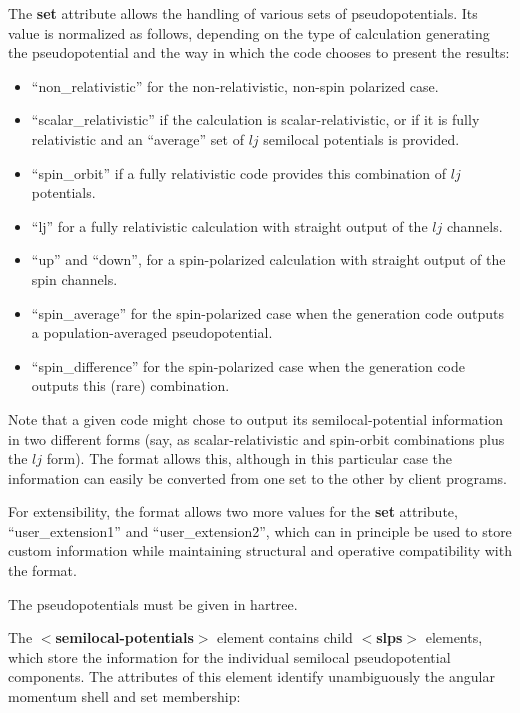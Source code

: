 \documentclass[prb,showpacs,superscriptaddress]{revtex4-1}
\def\tag#1{\textbf{$<$#1$>$}}
\def\att#1{\textbf{#1}}
\begin{document}
The \att{set} attribute allows the handling of various sets of
pseudopotentials. Its value is normalized as follows, depending on the
type of calculation generating the pseudopotential and the way in
which the code chooses to present the results:
%
 \begin{itemize}
 \item ``non\_relativistic'' for the non-relativistic, non-spin
   polarized case.
 \item ``scalar\_relativistic'' if the calculation is
   scalar-relativistic, or if it is fully relativistic and an
   ``average'' set of $lj$ semilocal potentials is provided.
 \item ``spin\_orbit'' if a fully relativistic code provides this
   combination of $lj$ potentials.
 \item ``lj'' for a fully relativistic calculation with straight
   output of the $lj$ channels.
 \item ``up'' and ``down'',  for a spin-polarized calculation with straight
   output of the spin channels.
 \item ``spin\_average'' for the spin-polarized case when the
   generation code outputs a population-averaged pseudopotential.
 \item ``spin\_difference'' for the spin-polarized case when the
   generation code outputs this (rare) combination.
\end{itemize}

Note that a given code might chose to output its semilocal-potential
information in two different forms (say, as scalar-relativistic and
spin-orbit combinations plus the $lj$ form). The format allows this,
although in this particular case the information can easily be
converted from one set to the other by client programs.

For extensibility, the format allows two more values for the \att{set}
attribute, ``user\_extension1'' and ``user\_extension2'', which can
in principle be used to store custom information while maintaining
structural and operative compatibility with the format.

The pseudopotentials must be given in hartree.

The \tag{semilocal-potentials} element contains child \tag{slps} elements, 
which store the information for the individual semilocal
pseudopotential components.  The attributes of this element identify
unambiguously the angular momentum shell and set membership:
\end{document}
